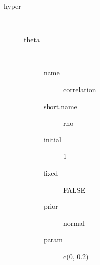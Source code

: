 \begin{description}
	\item[hyper]\ 
	 \begin{description}
	 	\item[theta]\ 
	 	 \begin{description}
	 	 	 \item[ name ] correlation 
	 	 	 \item[ short.name ] rho 
	 	 	 \item[ initial ] 1 
	 	 	 \item[ fixed ] FALSE 
	 	 	 \item[ prior ] normal 
	 	 	 \item[ param ] c(0, 0.2) 
	 	 \end{description}
	 \end{description}
\end{description}
